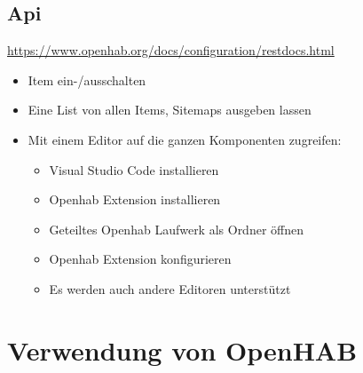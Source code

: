 \subsection{Api}
\url{https://www.openhab.org/docs/configuration/restdocs.html}
\begin{itemize}
	\item Item ein-/ausschalten
	\item Eine List von allen Items, Sitemaps ausgeben lassen
	\item Mit einem Editor auf die ganzen Komponenten zugreifen:
	\begin{itemize}
		\item Visual Studio Code installieren
		\item Openhab Extension installieren
		\item Geteiltes Openhab Laufwerk als Ordner öffnen
		\item Openhab Extension konfigurieren
		\item Es werden auch andere Editoren unterstützt
	\end{itemize}
\end{itemize}

\section{Verwendung von OpenHAB}
